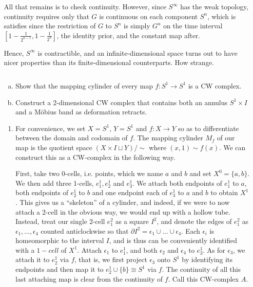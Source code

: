 \begin{homework}[e]
\begin{prf}
		All that remains is to check continuity. However, since $S^\infty$ has the weak topology, continuity requires only that $G$ is continuous on each component $S^n$, which is satisfies since the restriction of $G$ to $S^n$ is simply $G^n$ on the time interval $\left[1-\frac{1}{2^{n-1}}, 1-\frac{1}{2^n}\right]$, the identity prior, and the constant map after.

		Hence, $S^\infty$ is contractible, and an infinite-dimensional space turns out to have nicer properties than its finite-dimensional counterparts. How strange.
	\end{prf}
	\newpage
	 $ $
	\begin{enumerate}[(a)]
		\item Show that the mapping cylinder of every map $f:S^1 \to S^1$ is a CW complex.
		\item Construct a 2-dimensional CW complex that contains both an annulus $S^1\times I$ and a M\"obius band as deformation retracts.
	\end{enumerate}
	\begin{prf}
		\begin{enumerate}[(1)]
			\item For convenience, we set $X = S^1$, $Y = S^1$ and $f:X\to Y$ so as to differentiate between the domain and codomain of $f$. The mapping cylinder $M_f$ of our map is the quotient space $(X \times I \sqcup Y)/\sim$ where $(x,1) \sim f(x)$. We can construct this as a CW-complex in the following way.

			First, take two 0-cells, i.e. points, which we name $a$ and $b$ and set $X^0 = \{a,b\}$. We then add three 1-cells, $e^1_1,e^1_2$ and $e^1_3$. We attach both endpoints of $e^1_1$ to $a$, both endpoints of $e^1_2$ to $b$ and one endpoint each of $e^1_3$ to $a$ and $b$ to obtain $X^1$. This gives us a ``skeleton'' of a cylinder, and indeed, if we were to now attach a 2-cell in the obvious way, we would end up with a hollow tube. Instead, treat our single 2-cell $e^2_1$ as a square $I^2$, and denote the edges of $e^2_1$ as $\epsilon_1,...,\epsilon_4$ counted anticlockwise so that $\partial I^2 = \epsilon_1\cup...\cup \epsilon_4$. Each $\epsilon_i$ is homeomorphic to the interval $I$, and is thus can be conveniently identified with a $1-cell$ of $X^1$. Attach $\epsilon_1$ to $e^1_1$, and both $\epsilon_2$ and $\epsilon_4$ to $e^1_3$. As for $\epsilon_3$, we attach it to $e^1_2$ via $f$, that is, we first project $\epsilon_3$ onto $S^1$ by identifying its endpoints and then map it to $e^1_2 \cup \{b\}\cong S^1$ via $f$. The continuity of all this last attaching map is clear from the continuity of $f$. Call this CW-complex $A$.


\end{enumerate}
\end{prf}
\end{homework}
